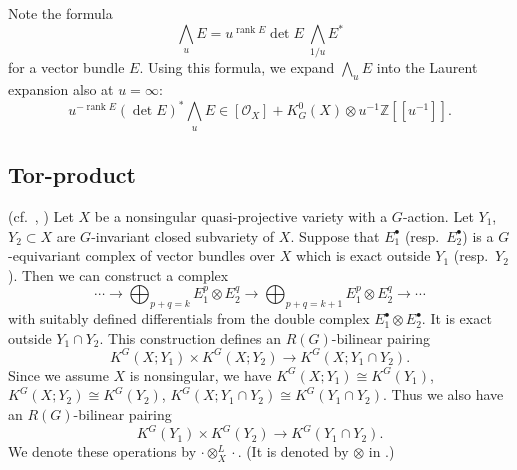 \documentclass[12pt]{amsart}
\def\Bbb{\mathbb}
\theoremstyle{definition}
\theoremstyle{remark}
\numberwithin{equation}{subsection}
\newcommand{\Z}{{\Bbb Z}}
\newcommand{\rank}{\operatorname{rank}}
\newcommand{\shfO}{\mathcal O}
\newcommand{\Wedge}{{\textstyle \bigwedge}}
\begin{document}
Note the formula
\begin{equation*}
   \Wedge_u E
   = u^{\rank E} \det E\; \Wedge_{1/u} E^*
\end{equation*}
for a vector bundle $E$.
Using this formula, we expand $\Wedge_u E$
into the Laurent expansion also at $u=\infty$:
\begin{equation*}
   u^{-\rank E}(\det E)^* \Wedge_u E
   \in [\shfO_X] + K_G^0(X)\otimes u^{-1}\Z[[u^{-1}]].
\end{equation*}

\subsection{Tor-product}\label{subsec:tor}
(cf.\ \cite[1.3]{BFM}, \cite[5.2.11]{Gi-book})
%
Let $X$ be a nonsingular quasi-projective variety with a
$G$-action.
Let $Y_1$, $Y_2\subset X$ are $G$-invariant closed subvariety 
of $X$.
Suppose that $E_1^\bullet$ (resp.\ $E_2^\bullet$) is a $G$-equivariant
complex of vector bundles over $X$ which is exact outside $Y_1$
(resp.\ $Y_2$).
Then we can construct a complex
\begin{equation*}
  \cdots
  \longrightarrow \bigoplus_{p+q=k} E_1^p\otimes E_2^q \longrightarrow
   \bigoplus_{p+q=k+1} E_1^p\otimes E_2^q \longrightarrow\cdots
\end{equation*}
with suitably defined differentials from the double complex
$E_1^\bullet\otimes E_2^\bullet$. It is exact outside $Y_1\cap
Y_2$. This construction defines an $R(G)$-bilinear pairing
\begin{equation*}
   K^G(X; Y_1) \times K^G(X; Y_2) \to K^G(X; Y_1\cap Y_2).
\end{equation*}
Since we assume $X$ is nonsingular, we have
$K^G(X;Y_1)\cong K^G(Y_1)$, $K^G(X;Y_2)\cong K^G(Y_2)$,
$K^G(X;Y_1\cap Y_2)\cong K^G(Y_1\cap Y_2)$. Thus we also have
an $R(G)$-bilinear pairing
\begin{equation*}
   K^G(Y_1) \times K^G(Y_2) \to K^G(Y_1\cap Y_2).
\end{equation*}
We denote these operations by $\cdot\otimes^L_X \cdot$.
(It is denoted by $\otimes$ in \cite{Gi-book}.)
\end{document}
